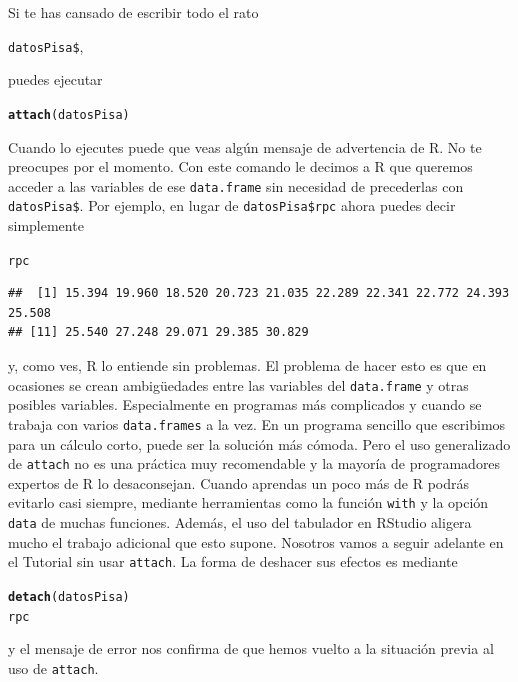 \documentclass[10pt,a4paper]{article}\usepackage[]{graphicx}\usepackage[]{color}
\makeatletter
\newcommand{\hlstd}[1]{\textcolor[rgb]{0.345,0.345,0.345}{#1}}%
\newcommand{\hlkwd}[1]{\textcolor[rgb]{0.737,0.353,0.396}{\textbf{#1}}}%
\newenvironment{kframe}{%
 \def\at@end@of@kframe{}%
 \ifinner\ifhmode%
  \def\at@end@of@kframe{\end{minipage}}%
  \begin{minipage}{\columnwidth}%
 \fi\fi%
 \def\FrameCommand##1{\hskip\@totalleftmargin \hskip-\fboxsep
 \colorbox{shadecolor}{##1}\hskip-\fboxsep
     \hskip-\linewidth \hskip-\@totalleftmargin \hskip\columnwidth}%
 \MakeFramed {\advance\hsize-\width
   \@totalleftmargin\z@ \linewidth\hsize
   \@setminipage}}%
 {\par\unskip\endMakeFramed%
 \at@end@of@kframe}
\newenvironment{knitrout}{}{} %
\newcounter {cont01}
\makeatother
\begin{document}
Si te has cansado de escribir todo el rato
\begin{center}
\verb#datosPisa$#,
\end{center}
puedes ejecutar
\begin{knitrout}
\color{fgcolor}\begin{kframe}
\begin{alltt}
  \hlkwd{attach}\hlstd{(datosPisa)}
\end{alltt}
\end{kframe}
\end{knitrout}
Cuando lo ejecutes puede que veas algún mensaje de advertencia de R. No te preocupes por el momento. Con este comando le decimos a R que queremos acceder a las variables de ese {\tt data.frame} sin necesidad de precederlas con \verb#datosPisa$#. Por ejemplo, en lugar de \verb#datosPisa$rpc# ahora puedes decir simplemente
\begin{knitrout}
\color{fgcolor}\begin{kframe}
\begin{alltt}
\hlstd{rpc}
\end{alltt}
\begin{verbatim}
##  [1] 15.394 19.960 18.520 20.723 21.035 22.289 22.341 22.772 24.393 25.508
## [11] 25.540 27.248 29.071 29.385 30.829
\end{verbatim}
\end{kframe}
\end{knitrout}
y, como ves, R lo entiende sin problemas. El problema de hacer esto es que en ocasiones se crean ambigüedades entre las variables del {\tt data.frame} y otras posibles variables. Especialmente en programas más complicados y cuando se trabaja con varios {\tt data.frames} a la vez. En un programa sencillo que escribimos para un cálculo corto, puede ser la solución más cómoda. Pero el uso generalizado de {\tt attach} no es una práctica muy recomendable y la mayoría de programadores expertos de R lo desaconsejan. Cuando aprendas un poco más de R podrás evitarlo casi siempre, mediante herramientas como la función {\tt with} y la opción {\tt data} de muchas funciones. Además, el uso del tabulador en RStudio aligera mucho el trabajo adicional que esto supone. Nosotros vamos a seguir adelante en el Tutorial sin usar {\tt attach}. La forma de deshacer sus efectos es mediante
\begin{knitrout}
\color{fgcolor}\begin{kframe}
\begin{alltt}
\hlkwd{detach}\hlstd{(datosPisa)}
\hlstd{rpc}
\end{alltt}


{\ttfamily\noindent\bfseries\color{errorcolor}{\#\# Error in eval(expr, envir, enclos): objeto 'rpc' no encontrado}}\end{kframe}
\end{knitrout}
y el mensaje de error nos confirma de que hemos vuelto a la situación previa al uso de {\tt attach}.
\end{document}
